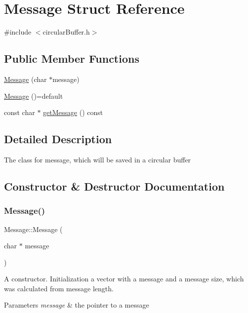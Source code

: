 \hypertarget{structMessage}{}\section{Message Struct Reference}
\label{structMessage}


{\ttfamily \#include $<$circular\+Buffer.\+h$>$}

\subsection*{Public Member Functions}
\begin{DoxyCompactItemize}
\item 
\mbox{\hyperlink{structMessage_a943bc494704306515fe417a8e8c35fb5}{Message}} (char $\ast$message)
\item 
\mbox{\hyperlink{structMessage_a4e0c3e0a2be25186519ba075d7851b71}{Message}} ()=default
\item 
const char $\ast$ \mbox{\hyperlink{structMessage_a7b0cfcdc5aa34356b38468b9ac390abb}{get\+Message}} () const
\end{DoxyCompactItemize}


\subsection{Detailed Description}
The class for message, which will be saved in a circular buffer 

\subsection{Constructor \& Destructor Documentation}
\mbox{\label{structMessage_a943bc494704306515fe417a8e8c35fb5}} 
\subsubsection{\texorpdfstring{Message()}{Message()}\hspace{0.1cm}{\footnotesize\ttfamily [1/2]}}
{\footnotesize\ttfamily Message\+::\+Message (\begin{DoxyParamCaption}\item[{char $\ast$}]{message }\end{DoxyParamCaption})}

A constructor. Initialization a vector with a message and a message size, which was calculated from message length. 
\begin{DoxyParams}{Parameters}
{\em message} & the pointer to a message \\
\hline
\end{DoxyParams}
\mbox{\label{structMessage_a4e0c3e0a2be25186519ba075d7851b71}} 
